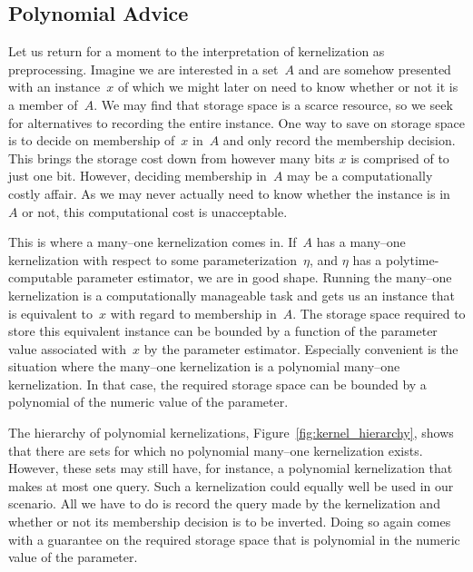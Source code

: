 \subsection{Polynomial Advice}
\label{sec:redundancy:advice}%
Let us return for a moment to the interpretation of kernelization as preprocessing.
Imagine we are interested in a set~$A$ and are somehow presented with an instance~$x$ of which we might later on need to know whether or not it is a member of~$A$.
We may find that storage space is a scarce resource, so we seek for alternatives to recording the entire instance.
One way to save on storage space is to decide on membership of~$x$ in~$A$ and only record the membership decision.
This brings the storage cost down from however many bits $x$ is comprised of to just one bit.
However, deciding membership in~$A$ may be a computationally costly affair.
As we may never actually need to know whether the instance is in~$A$ or not, this computational cost is unacceptable.

This is where a many--one kernelization comes in.
If~$A$ has a many--one kernelization with respect to some parameterization~$\eta$, and $\eta$ has a polytime-computable parameter estimator, we are in good shape.
Running the many--one kernelization is a computationally manageable task and gets us an instance that is equivalent to~$x$ with regard to membership in~$A$.
The storage space required to store this equivalent instance can be bounded by a function of the parameter value associated with~$x$ by the parameter estimator.
Especially convenient is the situation where the many--one kernelization is a polynomial many--one kernelization.
In that case, the required storage space can be bounded by a polynomial of the numeric value of the parameter.

The hierarchy of polynomial kernelizations, Figure~\ref{fig:kernel_hierarchy}, shows that there are sets for which no polynomial many--one kernelization exists.
However, these sets may still have, for instance, a polynomial kernelization that makes at most one query.
Such a kernelization could equally well be used in our scenario.
All we have to do is record the query made by the kernelization and whether or not its membership decision is to be inverted.
Doing so again comes with a guarantee on the required storage space that is polynomial in the numeric value of the parameter.

